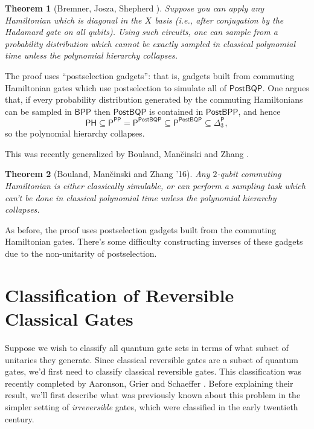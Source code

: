 \documentclass[11pt]{report}
\theoremstyle{plain}
\newtheorem{theorem}{Theorem}[section]
\theoremstyle{definition}
\begin{document}
\begin{theorem}[Bremner, Josza, Shepherd \cite{bremner}]
Suppose you can apply any Hamiltonian which is diagonal in the $X$ basis (i.e., after conjugation by the Hadamard gate on all qubits). Using such circuits, one can sample from a probability distribution which cannot be exactly sampled in classical polynomial time unless the polynomial hierarchy collapses.
\end{theorem}

The proof uses ``postselection gadgets'': that is, gadgets built from commuting Hamiltonian gates which use postselection to simulate all of $\mathsf{PostBQP}$. One argues that, if every probability distribution generated by the commuting Hamiltonians can be sampled in $\mathsf{BPP}$ then $\mathsf{PostBQP}$ is contained in $\mathsf{PostBPP}$, and hence
$$
\mathsf{PH} \subseteq \mathsf{P}^{\mathsf{PP}} = \mathsf{P}^{\mathsf{PostBQP}} \subseteq \mathsf{P}^{\mathsf{PostBQP}} \subseteq \mathsf{\Delta}_3^{\mathsf{P}},
$$
so the polynomial hierarchy collapses.

This was recently generalized by Bouland, Man\u{c}inski and Zhang \cite{bmz}.
\begin{theorem}[Bouland, Man\u{c}inski and Zhang '16]
Any $2$-qubit commuting Hamiltonian is either classically simulable, or can perform a sampling task which can't be done in classical polynomial time unless the polynomial hierarchy collapses.
\end{theorem}

As before, the proof uses postselection gadgets built from the commuting Hamiltonian gates. There's some difficulty constructing inverses of these gadgets due to the non-unitarity of postselection.

\section{Classification of Reversible Classical Gates}
\label{sec:classical}

Suppose we wish to classify all quantum gate sets in terms of what subset of unitaries they generate. Since classical reversible gates are a subset of quantum gates, we'd first need to classify classical reversible gates. This classification was recently completed by Aaronson, Grier and Schaeffer \cite{ReversibleGates}. Before explaining their result, we'll first describe what was previously known about this problem in the simpler setting of \emph{irreversible} gates, which were classified in the early twentieth century.
\end{document}
